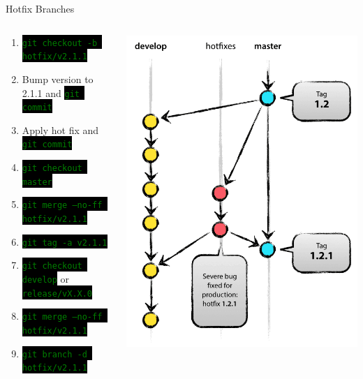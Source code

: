 \documentclass[
14pt,
aspectratio=169,
usenames,
dvipsnames,
x11names]{beamer}
\newcommand{\code}[1]{{\small\colorbox{black}{\textcolor{green}{\texttt{#1}}}}}
\begin{document}
\begin{frame}{Hotfix Branches}
  \begin{columns}
    \begin{column}{.65\linewidth}
      \minipage[c][0.75\textheight][s]{\columnwidth}
      \begin{enumerate} \setlength{\itemsep}{\fill}
      \item \code{git checkout -b hotfix/v2.1.1}
      \item Bump version to 2.1.1 and \code{git commit}
      \item Apply hot fix and \code{git commit}
      \item \code{git checkout master}
      \item \code{git merge --no-ff hotfix/v2.1.1}
      \item \code{git tag -a v2.1.1}
      \item \code{git checkout develop} or \code{release/vX.X.0}
      \item \code{git merge --no-ff hotfix/v2.1.1}
      \item \code{git branch -d hotfix/v2.1.1}
      \end{enumerate}
      \endminipage
    \end{column}
    \begin{column}{.35\linewidth}
      \centering
      \includegraphics[width=.8\textwidth]{hotfix-branches}
    \end{column}
  \end{columns}
\end{frame}
\end{document}
